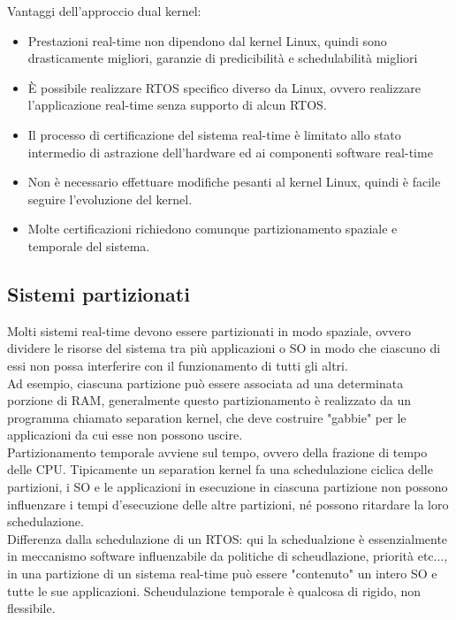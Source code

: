 \documentclass[12pt, oneside]{extbook}
\begin{document}
Vantaggi dell'approccio dual kernel:
\begin{itemize}
\item Prestazioni real-time non dipendono dal kernel Linux, quindi sono drasticamente migliori, garanzie di predicibilità e schedulabilità migliori
\item È possibile realizzare RTOS specifico diverso da Linux, ovvero realizzare l'applicazione real-time senza supporto di alcun RTOS.
\item Il processo di certificazione del sistema real-time è limitato allo stato intermedio di astrazione dell'hardware ed ai componenti software real-time
\item Non è necessario effettuare modifiche pesanti al kernel Linux, quindi è facile seguire l'evoluzione del kernel.
\item Molte certificazioni richiedono comunque partizionamento spaziale e temporale del sistema.
\end{itemize}
\subsection{Sistemi partizionati}
Molti sistemi real-time devono essere partizionati in modo spaziale, ovvero dividere le risorse del sistema tra più applicazioni o SO in modo che ciascuno di essi non possa interferire con il funzionamento di tutti gli altri.\\ Ad esempio, ciascuna partizione può essere associata ad una determinata porzione di RAM, generalmente questo partizionamento è realizzato da un programma chiamato separation kernel, che deve costruire "gabbie" per le applicazioni da cui esse non possono uscire. \\ Partizionamento temporale avviene sul tempo, ovvero della frazione di tempo delle CPU. Tipicamente un separation kernel fa una schedulazione ciclica delle partizioni, i SO e le applicazioni in esecuzione in ciascuna partizione non possono influenzare i tempi d'esecuzione delle altre partizioni, né possono ritardare la loro schedulazione.\\ Differenza dalla schedulazione di un RTOS: qui la schedualzione è essenzialmente in meccanismo software influenzabile da politiche di scheudlazione, priorità etc..., in una partizione di un sistema real-time può essere "contenuto" un intero SO e tutte le sue applicazioni. Scheudulazione temporale è qualcosa di rigido, non flessibile.
\end{document}
